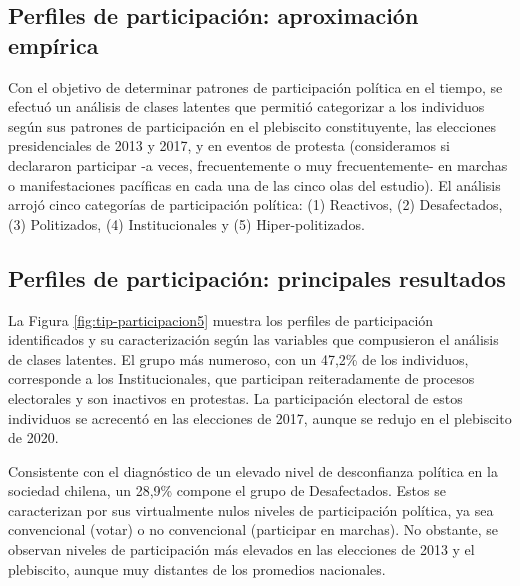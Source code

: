 \documentclass[
  12pt,
]{book}
\begin{document}
\hypertarget{perfiles-de-participaciuxf3n-aproximaciuxf3n-empuxedrica}{%
\subsection*{Perfiles de participación: aproximación empírica}\label{perfiles-de-participaciuxf3n-aproximaciuxf3n-empuxedrica}}

Con el objetivo de determinar patrones de participación política en el tiempo, se efectuó un análisis de clases latentes que permitió categorizar a los individuos según sus patrones de participación en el plebiscito constituyente, las elecciones presidenciales de 2013 y 2017, y en eventos de protesta (consideramos si declararon participar -a veces, frecuentemente o muy frecuentemente- en marchas o manifestaciones pacíficas en cada una de las cinco olas del estudio). El análisis arrojó cinco categorías de participación política: (1) Reactivos, (2) Desafectados, (3) Politizados, (4) Institucionales y (5) Hiper-politizados.

\hypertarget{perfiles-de-participaciuxf3n-principales-resultados}{%
\subsection*{Perfiles de participación: principales resultados}\label{perfiles-de-participaciuxf3n-principales-resultados}}

La Figura \ref{fig:tip-participacion5} muestra los perfiles de participación identificados y su caracterización según las variables que compusieron el análisis de clases latentes. El grupo más numeroso, con un 47,2\% de los individuos, corresponde a los Institucionales, que participan reiteradamente de procesos electorales y son inactivos en protestas. La participación electoral de estos individuos se acrecentó en las elecciones de 2017, aunque se redujo en el plebiscito de 2020.

Consistente con el diagnóstico de un elevado nivel de desconfianza política en la sociedad chilena, un 28,9\% compone el grupo de Desafectados. Estos se caracterizan por sus virtualmente nulos niveles de participación política, ya sea convencional (votar) o no convencional (participar en marchas). No obstante, se observan niveles de participación más elevados en las elecciones de 2013 y el plebiscito, aunque muy distantes de los promedios nacionales.
\end{document}
